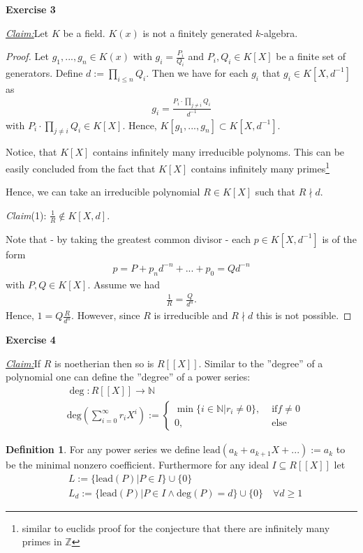 \documentclass{article}
\newcommand{\N}{\mathbb{N}}
\newcommand{\Z}{\mathbb{Z}}
\newcommand{\lead}{\mathrm{lead}}
\newcommand{\codeg}{\mathrm{deg}}
\newcommand{\inv}[1]{{#1}^{-1}}
\newcommand{\claim}
{\underline{\textit{Claim:}}\hspace{0,2cm}}
\newcommand{\subclaim}[1]
{

	\vspace*{0,2cm}
	\textit{Claim}({#1}):
}
\newcommand{\aufgabe}[1]{
{
	\vspace*{0.5cm}
	\noindent\textsf{\textbf{Exercise #1}}
	\vspace*{0.2cm}

}
}
\theoremstyle{definition}
\newtheorem*{silentdefn}{Definition}
\theoremstyle{plain}
\theoremstyle{remark}
\begin{document}
\aufgabe3 \claim Let $K$ be a field. $K(x)$ is not a finitely generated $k$-algebra.
\begin{proof}
	Let $g_1,...,g_n\in K(x)$ with $g_i = \frac{P_i}{Q_i}$ and $P_i,Q_i\in K[X]$ be a finite set of generators. Define $d := \prod_{i\leq n}Q_i$. Then we have for each $g_i$ that $g_i \in K[X,d^{-1}]$ as 
	\begin{align}
		g_i = \frac{P_i\cdot\prod_{j\neq i}Q_i}{\inv{d}}
	\end{align}
	with $P_i\cdot\prod_{j\neq i}Q_i\in K[X]$. Hence, $K[g_1,...,g_n]\subset K[X,\inv{d}]$. 
	
	Notice, that $K[X]$ contains infinitely many irreducible polynoms. This can be easily concluded from the fact that $K[X]$ contains infinitely many primes\footnote{similar to euclids proof for the conjecture that there are infinitely many primes in $\Z$}

	Hence, we can take an irreducible polynomial $R\in K[X]$ such that $R\nmid d$. 

	\subclaim1 $\frac{1}{R} \notin K[X,d]$.

	Note that - by taking the greatest common divisor - each $p\in K[X,\inv{d}]$ is of the form 
	\begin{align}
		p = P + p_n d^{-n} + ... + p_0 = Qd^{-n}
	\end{align}
	with $P,Q \in K[X]$. 
	Assume we had 
	\begin{align}
		\frac{1}{R} = \frac{Q}{d^n}.
	\end{align}
	Hence, $1 = Q \frac{R}{d^n}$. However, since $R$ is irreducible and $R\nmid d$ this is not possible. 

\end{proof}
\aufgabe4
\claim If $R$ is noetherian then so is $R[[X]]$. 
Similar to the ''degree'' of a polynomial one can define the ''degree'' of a power series:
\begin{align}
	&\deg:R[[X]]\rightarrow \N \\
	&\codeg\left(\sum_{i=0}^{\infty}r_iX^i\right):=
	\begin{cases}
		\min\{i\in\N|r_i\neq 0\}, &\text{ if} f\neq 0 \\
		0,			 &\text{ else}
	\end{cases}
\end{align}
\begin{silentdefn}
	For any power series we define $\lead(a_k+a_{k+1}X+...):=a_k$ to be the minimal nonzero coefficient. Furthermore for any ideal $I\subseteq R[[X]]$ let
	\begin{align}
		&L:=\{\lead(P)|P\in I\}\cup\{0\} \\
		&L_d :=\{\lead(P)|P\in I \wedge \codeg(P)=d\}\cup \{0\} \quad\forall{d\geq 1}
	\end{align}
\end{silentdefn}
\end{document}
